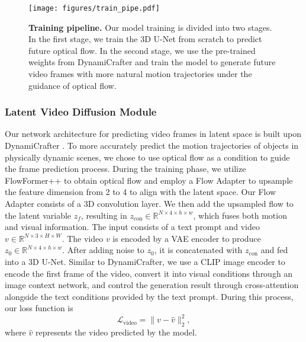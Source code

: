 \begin{figure*}[t]
  \centering
  \vspace{-10pt}
   \texttt{[image: figures/train\_pipe.pdf]}
   \vspace{-5pt}
   \caption{
   \textbf{Training pipeline.} Our model training is divided into two stages. In the first stage, we train the 3D U-Net from scratch to predict future optical flow. In the second stage, we use the pre-trained weights from DynamiCrafter and train the model to generate future video frames with more natural motion trajectories under the guidance of optical flow.}
   \label{fig:train_pipe}
   \vspace{-10pt}
\end{figure*}


\subsubsection{Latent Video Diffusion Module}

Our network architecture for predicting video frames in latent space is built upon DynamiCrafter \cite{dynamicrafter}. To more accurately predict the motion trajectories of objects in physically dynamic scenes, we chose to use optical flow as a condition to guide the frame prediction process. During the training phase, we utilize FlowFormer++ \cite{shi2023flowformer++} to obtain optical flow and employ a Flow Adapter to upsample the feature dimension from 2 to 4 to align with the latent space. Our Flow Adapter consists of a 3D convolution layer. We then add the upsampled flow to the latent variable \( z_f \), resulting in \( z_{\text{con}} \in \mathbb{R}^{N \times 4 \times h \times w} \), which fuses both motion and visual information. The input consists of a text prompt and video \( v \in \mathbb{R}^{N \times 3 \times H \times W} \). The video \( v \) is encoded by a VAE encoder to produce \( z_0 \in \mathbb{R}^{N \times 4 \times h \times w} \). After adding noise to \( z_0 \), it is concatenated with \(  z_{\text{con}} \) and fed into a 3D U-Net. Similar to DynamiCrafter, we use a CLIP image encoder to encode the first frame of the video, convert it into visual conditions through an image context network, and control the generation result through cross-attention alongside the text conditions provided by the text prompt. During this process, our loss function is
\begin{equation}
\mathcal{L}_\text{video} = \| v - \hat{v} \|_2^2,
\end{equation}
where \( \hat{v} \) represents the video predicted by the model.

